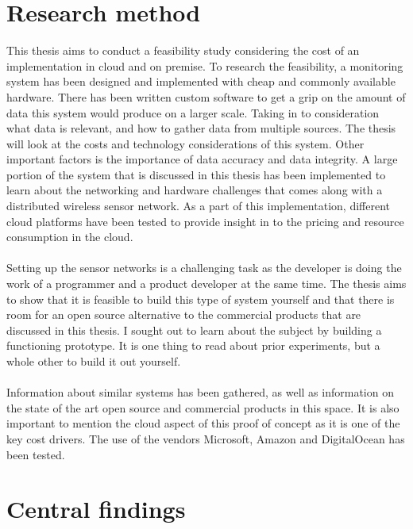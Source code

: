 \documentclass[]{uiophd}
\begin{document}
\section{Research method}
 This thesis aims to conduct a feasibility study considering the cost of an implementation in cloud and on premise. To research the feasibility, a monitoring system has been designed and implemented with cheap and commonly available hardware. There has been written custom software to get a grip on the amount of data this system would produce on a larger scale. Taking in to consideration what data is relevant, and how to gather data from multiple sources. The thesis will look at the costs and technology considerations of this system. Other important factors is the importance of data accuracy and data integrity. A large portion of the system that is discussed in this thesis has been implemented to learn about the networking and hardware challenges that comes along with a distributed wireless sensor network. As a part of this implementation, different cloud platforms have been tested to provide insight in to the pricing and resource consumption in the cloud. 
\\\\
Setting up the sensor networks is a challenging task as the developer is doing the work of a programmer and a product developer at the same time. The thesis aims to show that it is feasible to build this type of system yourself and that there is room for an open source alternative to the commercial products that are discussed in this thesis. I sought out to learn about the subject by building a functioning prototype. It is one thing to read about prior experiments, but a whole other to build it out yourself.
\\\\
Information about similar systems has been gathered, as well as information on the state of the art open source and commercial products in this space. It is also important to mention the cloud aspect of this proof of concept as it is one of the key cost drivers. The use of the vendors Microsoft, Amazon and DigitalOcean has been tested.

\section{Central findings}
\end{document}
